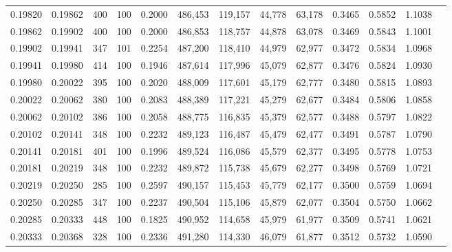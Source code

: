 \begin{tabular}{rrrrrrrrrrrrr}
0.19820 & 0.19862 &   400 & 100 &                                     0.2000 & 486,453 & 119,157 &  44,778 &  63,178 & 0.3465 & 0.5852 & 1.1038 \\
0.19862 & 0.19902 &   400 & 100 &                                     0.2000 & 486,853 & 118,757 &  44,878 &  63,078 & 0.3469 & 0.5843 & 1.1001 \\
0.19902 & 0.19941 &   347 & 101 &                                     0.2254 & 487,200 & 118,410 &  44,979 &  62,977 & 0.3472 & 0.5834 & 1.0968 \\
0.19941 & 0.19980 &   414 & 100 &                                     0.1946 & 487,614 & 117,996 &  45,079 &  62,877 & 0.3476 & 0.5824 & 1.0930 \\
0.19980 & 0.20022 &   395 & 100 &                                     0.2020 & 488,009 & 117,601 &  45,179 &  62,777 & 0.3480 & 0.5815 & 1.0893 \\
0.20022 & 0.20062 &   380 & 100 &                                     0.2083 & 488,389 & 117,221 &  45,279 &  62,677 & 0.3484 & 0.5806 & 1.0858 \\
0.20062 & 0.20102 &   386 & 100 &                                     0.2058 & 488,775 & 116,835 &  45,379 &  62,577 & 0.3488 & 0.5797 & 1.0822 \\
0.20102 & 0.20141 &   348 & 100 &                                     0.2232 & 489,123 & 116,487 &  45,479 &  62,477 & 0.3491 & 0.5787 & 1.0790 \\
0.20141 & 0.20181 &   401 & 100 &                                     0.1996 & 489,524 & 116,086 &  45,579 &  62,377 & 0.3495 & 0.5778 & 1.0753 \\
0.20181 & 0.20219 &   348 & 100 &                                     0.2232 & 489,872 & 115,738 &  45,679 &  62,277 & 0.3498 & 0.5769 & 1.0721 \\
0.20219 & 0.20250 &   285 & 100 &                                     0.2597 & 490,157 & 115,453 &  45,779 &  62,177 & 0.3500 & 0.5759 & 1.0694 \\
0.20250 & 0.20285 &   347 & 100 &                                     0.2237 & 490,504 & 115,106 &  45,879 &  62,077 & 0.3504 & 0.5750 & 1.0662 \\
0.20285 & 0.20333 &   448 & 100 &                                     0.1825 & 490,952 & 114,658 &  45,979 &  61,977 & 0.3509 & 0.5741 & 1.0621 \\
0.20333 & 0.20368 &   328 & 100 &                                     0.2336 & 491,280 & 114,330 &  46,079 &  61,877 & 0.3512 & 0.5732 & 1.0590 \\

\end{tabular}
